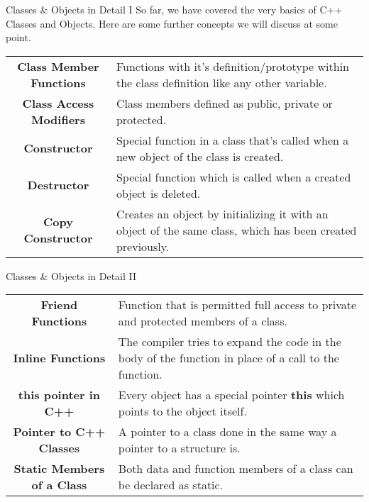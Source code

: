 \documentclass[../lecture5-objectorientation.tex]{subfiles}
\begin{document}
\begin{frame}[fragile]{Classes \& Objects in Detail I}
    So far, we have covered the very basics of C++ Classes and Objects. Here are some further concepts we will discuss at some point. \newline

    \begin{table}[h]
        \center
        \begin{tabularx}{\textwidth}{c X}
            \textbf{Class Member Functions} & Functions with it's definition/prototype within the class definition like any other variable. \\[0.3cm]
            \textbf{Class Access Modifiers} & Class members defined as public, private or protected. \\[0.3cm]
            \textbf{Constructor} & Special function in a class that's called when a new object of the class is created. \\[0.3cm]
            \textbf{Destructor} & Special function which is called when a created object is deleted. \\[0.3cm]
            \textbf{Copy Constructor} & Creates an object by initializing it with an object of the same class, which has been created previously. \\
        \end{tabularx}
    \end{table}
\end{frame}

\begin{frame}[fragile]{Classes \& Objects in Detail II}
    \begin{table}[h]
        \center
        \begin{tabularx}{\textwidth}{c X}
            \textbf{Friend Functions} & Function that is permitted full access to private and protected members of a class. \\[0.3cm]
            \textbf{Inline Functions} & The compiler tries to expand the code in the body of the function in place of a call to the function. \\[0.3cm]
            \textbf{this pointer in C++} & Every object has a special pointer \textbf{this} which points to the object itself. \\[0.3cm]
            \textbf{Pointer to C++ Classes} & A pointer to a class done in the same way a pointer to a structure is. \\[0.3cm]
            \textbf{Static Members of a Class} & Both data and function members of a class can be declared as static. \\
        \end{tabularx}
    \end{table}
\end{frame}

\end{document}
